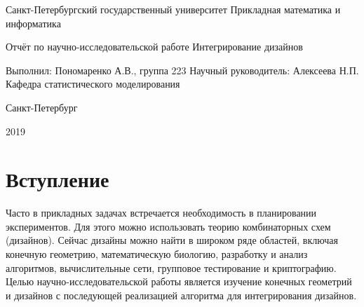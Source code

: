 \documentclass[12pt]{article}
\begin{document}
\Large
\begin{center}
Санкт-Петербургский государственный университет\newline
Прикладная математика и информатика\newline\newline\newline\newline\newline\newline
\end{center}
\begin{center} 
Отчёт по научно-исследовательской работе\newline
Интегрирование дизайнов\newline\newline\newline\newline\newline
\end{center}

\hspace*{55mm}Выполнил:\newline
\hspace*{61mm}Пономаренко А.В., группа 223\newline
\hspace*{61mm}Научный руководитель:\newline
\hspace*{61mm}Алексеева Н.П.\newline
\hspace*{61mm}Кафедра статистического моделирования\newline\newline\newline\newline\newline\newline\newline
\begin{center}
Санкт-Петербург

2019    
\end{center}
\normalsize
\newpage
\section{Вступление}
Часто в прикладных задачах встречается необходимость в планировании экспериментов. Для этого можно использовать теорию комбинаторных схем (дизайнов). Сейчас дизайны можно найти в широком ряде областей, включая конечную геометрию, математическую биологию, разработку и анализ алгоритмов, вычислительные сети, групповое тестирование и криптографию.\newline\newline
Целью научно-исследовательской работы является изучение конечных геометрий и дизайнов с последующей реализацией алгоритма для интегрирования дизайнов.
\end{document}
